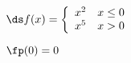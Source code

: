 {%
$\ds f(x) = \left\{\begin{array}{cc} x^2 & x\leq 0 \\ x^5 & x> 0 \end{array} \right.$

}
{$\fp(0) = 0$
}
